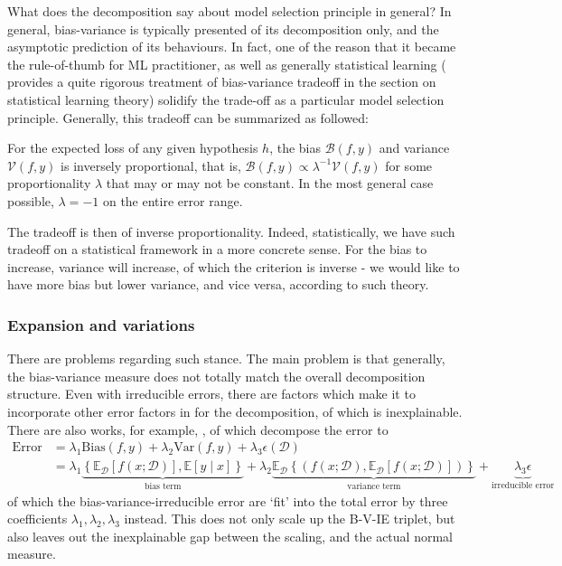 What does the decomposition say about model selection principle in general? In general, bias-variance is typically presented of its decomposition only, and the asymptotic prediction of its behaviours. In fact, one of the reason that it became the rule-of-thumb for ML practitioner, as well as generally statistical learning (\cite{lafon_understanding_2024} provides a quite rigorous treatment of bias-variance tradeoff in the section on statistical learning theory) solidify the trade-off as a particular model selection principle. Generally, this tradeoff can be summarized as followed: 
\begin{theorem}
    For the expected loss of any given hypothesis $h$, the bias $\mathcal{B}(f,y)$ and variance $\mathcal{V}(f,y)$ is inversely proportional, that is, $\mathcal{B}(f,y)\propto \lambda^{-1} \mathcal{V}(f,y)$ for some proportionality $\lambda$ that may or may not be constant. In the most general case possible, $\lambda = -1$ on the entire error range. 
\end{theorem}

The tradeoff is then of inverse proportionality. Indeed, statistically, we have such tradeoff on a statistical framework in a more concrete sense. For the bias to increase, variance will increase, of which the criterion is inverse - we would like to have more bias but lower variance, and vice versa, according to such theory. 

\subsubsection{Expansion and variations}

There are problems regarding such stance. The main problem is that generally, the bias-variance measure does not totally match the overall decomposition structure. Even with irreducible errors, there are factors which make it to incorporate other error factors in for the decomposition, of which is inexplainable. There are also works, for example, \cite{domingos_unifeid_2000}, of which decompose the error to 
\begin{equation*}
        \begin{split}
            \mathrm{Error} & = \lambda_{1} \mathrm{Bias}(f,y) + \lambda_{2}\mathrm{Var}(f,y)+ \lambda_{3}\epsilon(\mathcal{D})\\ 
            & = \lambda_{1}\underbrace{\left\{ \mathbb{E}_{\mathcal{D}}[f(x;\mathcal{D})] , \mathbb{E}[y\mid x] \right\}}_{\text{bias term}} +\lambda_{2} \underbrace{\mathbb{E}_{\mathcal{D}} \left\{(f(x;\mathcal{D}), \mathbb{E}_{\mathcal{D}}[f(x;\mathcal{D})])\right\}}_{\text{variance term}} +\underbrace{\lambda_{3}\epsilon}_{\text{irreducible error}}
        \end{split}
\end{equation*}
of which the bias-variance-irreducible error are `fit' into the total error by three coefficients $\lambda_{1},\lambda_{2},\lambda_{3}$ instead. This does not only scale up the B-V-IE triplet, but also leaves out the inexplainable gap between the scaling, and the actual normal measure. 

